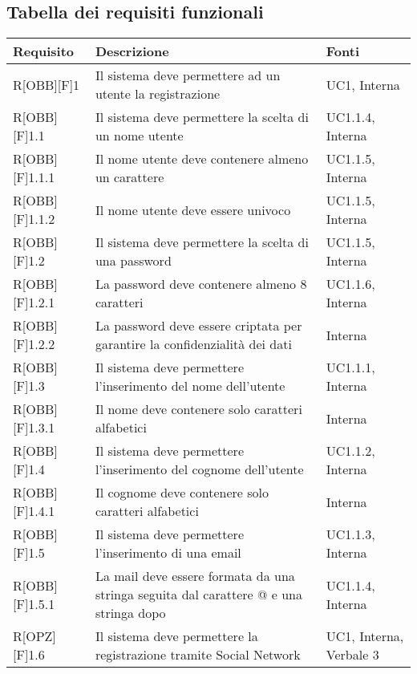 \subsection{Tabella dei requisiti funzionali}
	\begin{table}[h]
		\begin{tabular}{|p{}|p{}|p{}|}
			\toprule

			\textbf{Requisito} & \textbf{Descrizione} & \textbf{Fonti} \\

			\midrule

			R[OBB][F]1 & Il sistema deve permettere ad un utente la registrazione & UC1, Interna \\ \midrule
			R[OBB][F]1.1 & Il sistema deve permettere la scelta di un nome utente & UC1.1.4, Interna \\ \midrule
			R[OBB][F]1.1.1 & Il nome utente deve contenere almeno un carattere & UC1.1.5, Interna \\ \midrule
			R[OBB][F]1.1.2 & Il nome utente deve essere univoco & UC1.1.5, Interna \\ \midrule
			R[OBB][F]1.2 & Il sistema deve permettere la scelta di una password & UC1.1.5, Interna \\ \midrule
			R[OBB][F]1.2.1 & La password deve contenere almeno 8 caratteri & UC1.1.6, Interna \\ \midrule
			R[OBB][F]1.2.2 & La password deve essere criptata per garantire la confidenzialità dei dati & Interna \\ \midrule
			R[OBB][F]1.3 & Il sistema deve permettere l'inserimento del nome dell'utente & UC1.1.1, Interna \\ \midrule
			R[OBB][F]1.3.1 & Il nome deve contenere solo caratteri alfabetici & Interna \\ \midrule
			R[OBB][F]1.4 & Il sistema deve permettere l'inserimento del cognome dell'utente & UC1.1.2, Interna \\ \midrule
			R[OBB][F]1.4.1 & Il cognome deve contenere solo caratteri alfabetici & Interna \\ \midrule
			R[OBB][F]1.5 & Il sistema deve permettere l'inserimento di una email & UC1.1.3, Interna \\ \midrule
			R[OBB][F]1.5.1 & La mail deve essere formata da una stringa seguita dal carattere @ e una stringa dopo & UC1.1.4, Interna \\ \midrule
			R[OPZ][F]1.6 & Il sistema deve permettere la registrazione tramite Social Network & UC1, Interna, Verbale 3 \\ \midrule

	\end{tabular}
	\end{table}
	\newpage

